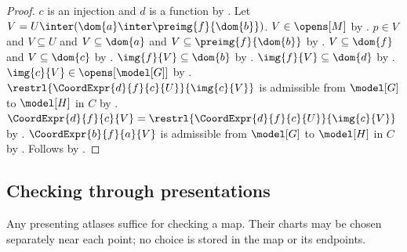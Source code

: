 \begin{proof}
    $c$ is an injection and $d$ is a function by
        .
    Let $V=U\inter(\dom{a}\inter\preimg{f}{\dom{b}})$.
    $V\in\opens[M]$ by .
    $p\in V$ and $V\subseteq U$ and $V\subseteq\dom{a}$ and
        $V\subseteq\preimg{f}{\dom{b}}$ by .
    $V\subseteq\dom{f}$ and $V\subseteq\dom{c}$ by .
    $\img{f}{V}\subseteq\dom{b}$ by .
    $\img{f}{V}\subseteq\dom{d}$ by .
    $\img{c}{V}\in\opens[\model[G]]$ by .
    $\restrl{\CoordExpr{d}{f}{c}{U}}{\img{c}{V}}$ is admissible
        from $\model[G]$ to $\model[H]$ in $C$ by .
    $\CoordExpr{d}{f}{c}{V}=\restrl{\CoordExpr{d}{f}{c}{U}}{\img{c}{V}}$ by
        .
    $\CoordExpr{b}{f}{a}{V}$ is admissible from $\model[G]$ to $\model[H]$ in $C$ by
        .
    Follows by \auto.
\end{proof}

\subsection{Checking through presentations}

Any presenting atlases suffice for checking a map. Their charts may be chosen
separately near each point; no choice is stored in the map or its endpoints.

